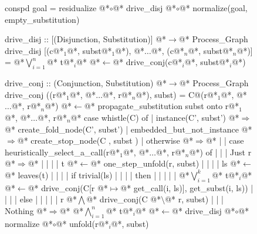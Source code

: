 \documentclass[12pt,a4paper]{report}
\begin{document}
\thispagestyle{empty}
\begin{figure}[h]
\begin{PseudoCode}[moredelim={[is][stringstyle]{@@}{@@}},
  moredelim={[is][\color{dkgreen}\bfseries]{@!}{@!}},
  moredelim={[is][\color{red}\bfseries]{!!}{!!}}]
conspd goal = residualize @*$\circ$@* drive_disj @*$\circ$@* normalize(goal, empty_substitution)

drive_disj :: [(Disjunction, Substitution)] @*$\to$@* Process_Graph
drive_disj [(c@*$_1$@*, subst@*$_1$@*), @*$\dots$@*, (c@*$_n$@*, subst@*$_n$@*)] = @*$\bigvee_{i=1}^n$@* t@*$_i$@* @*$\leftarrow$@* drive_conj(c@*$_i$@*, subst@*$_i$@*)

drive_conj :: (Conjunction, Substitution) @*$\to$@* Process_Graph
drive_conj ((r@*$_1$@*, @*$\dots$@*, r@*$_n$@*), subst) =
  C@(r@*$_1$@*, @*$\dots$@*, r@*$_n$@*) @*$\leftarrow$@* propagate_substitution subst onto r@*$_1$@*, @*$\dots$@*, r@*$_n$@*
  case whistle(C) of
  | instance(C', subst')      @*$\Rightarrow$@* create_fold_node(C', subst')
  | embedded_but_not_instance @*$\Rightarrow$@* create_stop_node(C , subst )
  | otherwise @*$\Rightarrow$@*
  | | case heuristically_select_a_call(r@*$_1$@*, @*$\dots$@*, r@*$_n$@*) of
  | | | Just r @*$\Rightarrow$@*
  | | | | t @*$\leftarrow$@* one_step_unfold(r, subst)
  | | | | ls  @*$\leftarrow$@* leaves(t)
  | | | | if trivial(ls)
  | | | | then
  | | | | | @*$\bigvee_{i=1}^k$@* t@*$_i$@* @*$\leftarrow$@* drive_conj(C[r @*$\mapsto$@* get_call(i, ls)], get_subst(i, ls))
  | | | | else
  | | | | | r @*$\bigwedge$@* drive_conj(C @*$\setminus$@* r, subst)
  | | | Nothing @*$\Rightarrow$@* @*$\bigwedge_{i=1}^n$@* t@*$_i$@* @*$\leftarrow$@* drive_disj @*$\circ$@* normalize @*$\circ$@* unfold(r@*$_i$@*, subst)
\end{PseudoCode}
\end{figure}
\end{document}
